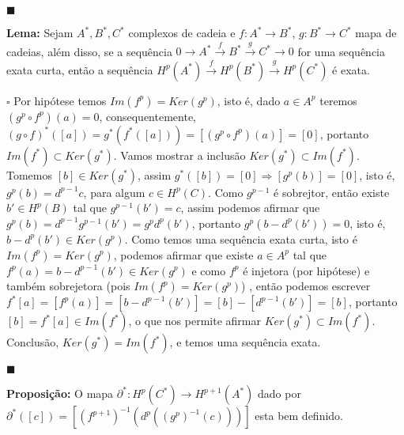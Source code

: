 \documentclass{article}
\begin{document}
	$\blacksquare$
	
	\vspace{2mm}
	\textbf{Lema:} Sejam $A^{*}, B^{*}, C^{*}$ complexos de cadeia e $f:A^{*} \to B^{*}$, $g:B^{*} \to C^{*}$ mapa de cadeias, além disso, se a sequência $0 \to A^{*} \xrightarrow{f} B^{*} \xrightarrow{g} C^{*} \to 0$ for uma sequência exata curta, então a sequência $H^{p}(A^{*}) \xrightarrow{f} H^{p}(B^{*}) \xrightarrow{g} H^{p}(C^{*}) $ é exata.
	
	$\square$ Por hipótese temos $Im(f^{p}) = Ker(g^{p})$, isto é, dado $a \in A^{p}$ teremos $(g^{p}\circ f^{p})(a) = 0$, consequentemente, $(g\circ f)^{*}([a]) = g^{*}(f^{*}([a])) = [(g^{p}\circ f^{p})(a)] = [0]$, portanto $Im(f^{*}) \subset Ker(g^{*})$. Vamos mostrar a inclusão $Ker(g^{*}) \subset Im(f^{*})$. Tomemos $[b] \in Ker(g^{*})$, assim $g^{*}([b]) = [0] \Rightarrow [g^{p}(b)] = [0]$, isto é, $g^{p}(b) = d^{p-1}c$, para algum $c \in H^{p}(C)$. Como $g^{p-1}$ é sobrejtor, então existe $b' \in H^{p}(B)$ tal que $g^{p-1}(b') = c$, assim podemos afirmar que $g^{p}(b) = d^{p-1}g^{p-1}(b') = g^{p}d^{p}(b')$, portanto $g^{p}(b - d^{p}(b')) = 0$, isto é, $b - d^{p}(b') \in Ker(g^{p})$. Como temos uma sequência exata curta, isto é $Im(f^{p}) = Ker(g^{p})$, podemos afirmar que existe $a \in A^{p}$ tal que $f^{p}(a) = b - d^{p-1}(b') \in Ker(g^{p})$ e como $f^{p}$ é injetora (por hipótese) e também sobrejetora (pois $Im(f^{p}) = Ker(g^{p})$) , então podemos escrever $f^{*}[a] = [f^{p}(a)] = [b - d^{p-1}(b')] =  [b] - [d^{p-1}(b')] = [b]$, portanto $[b] = f^{*}[a] \in Im(f^{*})$, o que nos permite afirmar $Ker(g^{*}) \subset Im(f^{*})$. Conclusão, $Ker(g^{*}) = Im(f^{*})$, e temos uma sequência exata. 
	
	$\blacksquare$
	
	\vspace{2mm}
	\textbf{Proposição:} O mapa $\partial^{*}: H^{p}(C^{*}) \to H^{p+1}(A^{*})$ dado por $\partial^{*}([c]) = [(f^{p+1})^{-1}(d^{p}((g^{p})^{-1}(c)))] $ esta bem definido.
	
\end{document}

